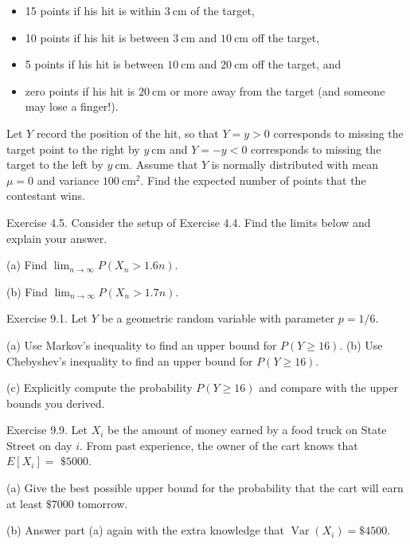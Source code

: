 \documentclass[10pt]{article}
\begin{document}
\begin{itemize}
  \item 15 points if his hit is within $3 \mathrm{~cm}$ of the target,

  \item 10 points if his hit is between $3 \mathrm{~cm}$ and $10 \mathrm{~cm}$ off the target,

  \item 5 points if his hit is between $10 \mathrm{~cm}$ and $20 \mathrm{~cm}$ off the target, and

  \item zero points if his hit is $20 \mathrm{~cm}$ or more away from the target (and someone may lose a finger!).

\end{itemize}

Let $Y$ record the position of the hit, so that $Y=y>0$ corresponds to missing the target point to the right by $y \mathrm{~cm}$ and $Y=-y<0$ corresponds to missing the target to the left by $y \mathrm{~cm}$. Assume that $Y$ is normally distributed with mean $\mu=0$ and variance $100 \mathrm{~cm}^{2}$. Find the expected number of points that the contestant wins.

\hfill \break
Exercise 4.5. Consider the setup of Exercise 4.4. Find the limits below and explain your answer.

(a) Find $\lim _{n \rightarrow \infty} P\left(X_{n}>1.6 n\right)$.

(b) Find $\lim _{n \rightarrow \infty} P\left(X_{n}>1.7 n\right)$.

\hfill \break
Exercise 9.1. Let $Y$ be a geometric random variable with parameter $p=1 / 6$.

(a) Use Markov's inequality to find an upper bound for $P(Y \geq 16)$. (b) Use Chebyshev's inequality to find an upper bound for $P(Y \geq 16)$.

(c) Explicitly compute the probability $P(Y \geq 16)$ and compare with the upper bounds you derived.

\hfill \break
Exercise 9.9. Let $X_{i}$ be the amount of money earned by a food truck on State Street on day $i$. From past experience, the owner of the cart knows that $E\left[X_{i}\right]=$ $\$ 5000$.

(a) Give the best possible upper bound for the probability that the cart will earn at least $\$ 7000$ tomorrow.

(b) Answer part (a) again with the extra knowledge that $\operatorname{Var}\left(X_{i}\right)=\$ 4500$.
\end{document}
